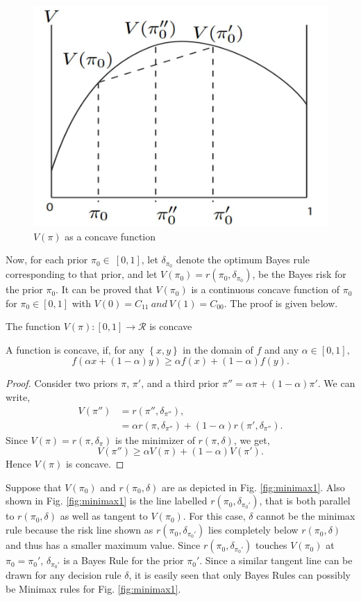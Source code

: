 \documentclass[a4paper,english,12pt]{article}
\begin{document}
\begin{figure}[h]
	\centering
	\includegraphics[width=0.7\linewidth]{Figures/concave}
	\caption{$V(\pi)$ as a concave function}
	\label{fig:concave}
\end{figure}
\par Now, for each prior $\pi_0 \in~[0,1]$, let $\delta_{\pi_0}$ denote the optimum Bayes rule corresponding to that prior, and let $V(\pi_0) = r(\pi_0,\delta_{\pi_0}) $, be the Bayes risk for the prior $\pi_0$. It can be proved that $V(\pi_0)$ is a continuous concave function of $\pi_0$ for $\pi_0 \in [0,1]$ with $V(0)=C_{11} ~and~ V(1)=C_{00}$. The proof is given below.
\begin{lem}
The function \textbf{$V(\pi):[0,1] \to\mathcal R$} is concave
\end{lem}
A function is concave, if, for any $\left\lbrace x,y\right\rbrace$ in the domain of $f$ and any $\alpha  \in [0,1],$
\begin{equation}\nonumber
f(\alpha x + (1 - \alpha )y) \ge \alpha f(x) + (1 - \alpha )f(y).
\end{equation}
\begin{proof}
Consider two priors $\pi$, $\pi'$, and a third prior $\pi''=\alpha \pi  + (1 - \alpha )\pi'$. We can write,
\begin{align}
V(\pi'' ) &= r(\pi'',\delta_{\pi''}),\\ \nonumber
&=\alpha r(\pi,{\delta_{\pi''} }) + (1 - \alpha )r(\pi' ,{\delta_{\pi ''}}).
\end{align}
Since $V(\pi)=r(\pi,\delta_\pi)$ is the minimizer of $r(\pi,\delta)$, we get,
\begin{equation}
V(\pi'' ) \ge \alpha V(\pi ) + (1 - \alpha )V(\pi' ).
\end{equation}
Hence $V(\pi)$ is concave.
\end{proof}
\par Suppose that $V(\pi_0)$ and $r(\pi_0,\delta)$ are as depicted in Fig. \ref{fig:minimax1}. Also shown in Fig. \ref{fig:minimax1} is the line labelled $r({\pi _0},{\delta _{{\pi _0'}}})$, that is both parallel to $r({\pi _0},{\delta})$ as well as tangent to $V(\pi_0)$. For this case, $\delta$ cannot be the minimax rule because the risk line shown as $r({\pi _0},{\delta _{{\pi _0'}}})$  lies completely below $r({\pi _0},{\delta})$ and thus has a smaller maximum value. Since $r({\pi _0},{\delta _{{\pi _0'}}})$ touches $V(\pi_0)$ at $\pi_0 = \pi_0'$, $\delta _{{\pi _0'}}$ is a Bayes Rule for the prior $\pi_0'$. Since a similar tangent line can be drawn for any decision rule $\delta$, it is easily seen that only Bayes Rules can possibly be Minimax rules for Fig. \ref{fig:minimax1}.
\end{document}
